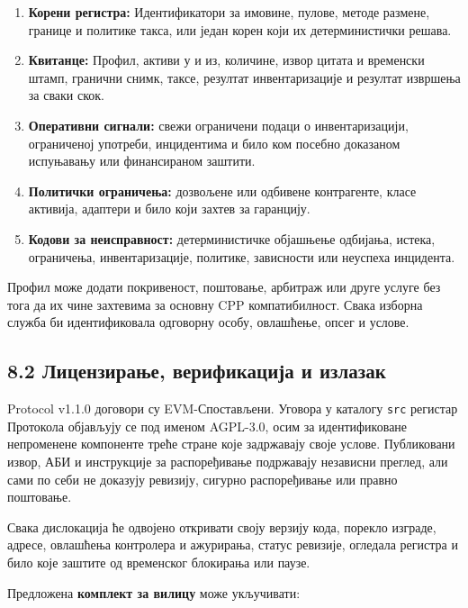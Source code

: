 \documentclass[11pt]{article}
\begin{document}
\begin{enumerate}[leftmargin=*]
\item \textbf{Корени регистра:} Идентификатори за имовине, пулове, методе размене, границе и политике такса, или један корен који их детерминистички решава.
\item \textbf{Квитанце:} Профил, активи у и из, количине, извор цитата и временски штамп, гранични снимк, таксе, резултат инвентаризације и резултат извршења за сваки скок.
\item \textbf{Оперативни сигнали:} свежи ограничени подаци о инвентаризацији, ограниченој употреби, инцидентима и било ком посебно доказаном испуњавању или финансираном заштити.
\item \textbf{Политички ограничења:} дозвољене или одбивене контрагенте, класе активија, адаптери и било који захтев за гаранцију.
\item \textbf{Кодови за неисправност:} детерминистичке објашњење одбијања, истека, ограничења, инвентаризације, политике, зависности или неуспеха инцидента.
\end{enumerate}
Профил може додати покривеност, поштовање, арбитраж или друге услуге без тога да их чине захтевима за основну CPP компатибилност. Свака изборна служба би идентификовала одговорну особу, овлашћење, опсег и услове.

\subsection*{8.2 Лицензирање, верификација и излазак}

Protocol v1.1.0 договори су EVM-Спостављени. Уговора у каталогу \texttt{src} регистар Протокола објављују се под именом AGPL-3.0, осим за идентификоване непроменене компоненте треће стране које задржавају своје услове. Публиковани извор, АБИ и инструкције за распоређивање подржавају независни преглед, али сами по себи не доказују ревизију, сигурно распоређивање или правно поштовање.

Свака дислокација ће одвојено откривати своју верзију кода, порекло изграде, адресе, овлашћења контролера и ажурирања, статус ревизије, огледала регистра и било које заштите од временског блокирања или паузе.

Предложена \textbf{комплект за вилицу} може укључивати:
\end{document}
